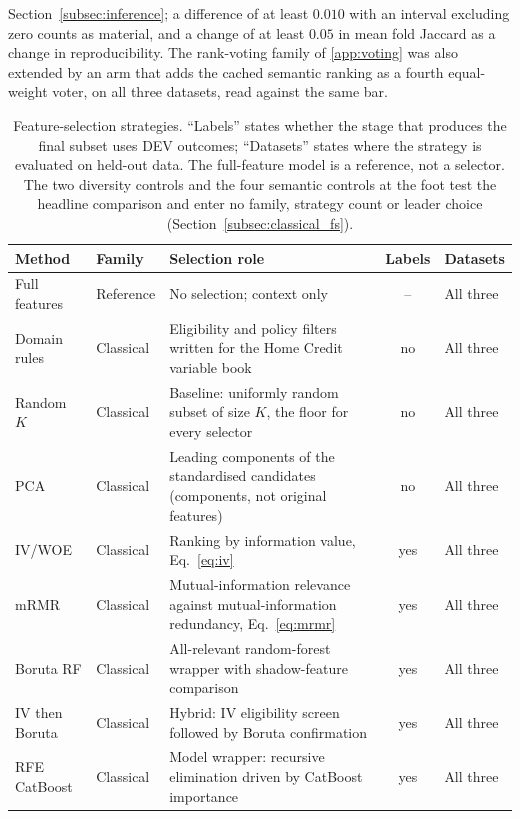 \documentclass[final,5p,twocolumn]{elsarticle}
\newcommand{\Kfeat}{K}
\begin{document}
Section~\ref{subsec:inference}; a difference of at least $0.010$ with an interval excluding zero counts as material, and a change of at least $0.05$ in mean fold Jaccard as a change in reproducibility. The rank-voting family of \ref{app:voting} was also extended by an arm that adds the cached semantic ranking as a fourth equal-weight voter, on all three datasets, read against the same bar.

\begin{table}[htbp]
\centering
\footnotesize
\begin{threeparttable}
\caption{Feature-selection strategies. ``Labels'' states whether the stage that produces the final subset uses DEV outcomes; ``Datasets'' states where the strategy is evaluated on held-out data. The full-feature model is a reference, not a selector. The two diversity controls and the four semantic controls at the foot test the headline comparison and enter no family, strategy count or leader choice (Section~\ref{subsec:classical_fs}).}
\label{tab:methods}
\begin{tabular}{@{}llL{46mm}cl@{}}
\toprule
Method & Family & Selection role & Labels & Datasets \\
\midrule
Full features & Reference & No selection; context only & -- & All three \\
Domain rules & Classical & Eligibility and policy filters written for the Home Credit variable book & no & All three \\
Random $\Kfeat$ & Classical & Baseline: uniformly random subset of size $\Kfeat$, the floor for every selector & no & All three \\
PCA & Classical & Leading components of the standardised candidates (components, not original features) & no & All three \\
IV/WOE & Classical & Ranking by information value, Eq.~\eqref{eq:iv} & yes & All three \\
mRMR & Classical & Mutual-information relevance against mutual-information redundancy, Eq.~\eqref{eq:mrmr} & yes & All three \\
Boruta RF & Classical & All-relevant random-forest wrapper with shadow-feature comparison & yes & All three \\
IV then Boruta & Classical & Hybrid: IV eligibility screen followed by Boruta confirmation & yes & All three \\
RFE CatBoost & Classical & Model wrapper: recursive elimination driven by CatBoost importance & yes & All three \\

\end{tabular}
\end{threeparttable}
\end{table}
\end{document}
